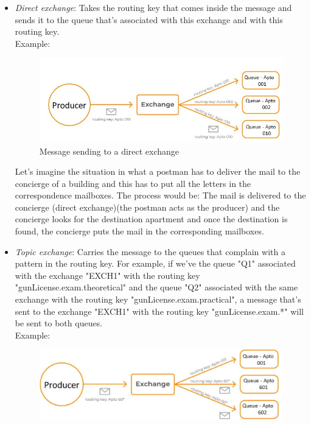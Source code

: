 \documentclass[4paper,12pt]{article}
\begin{document}
\begin{itemize}
    \item \textit{Direct exchange}: Takes the routing key that comes inside the message and sends it to the queue that's associated with this exchange and with this routing key.\\
    Example:\\
    \begin{figure}[H]
        \centering
        \includegraphics[scale = 0.7]{Images/direct_exchange.jpg}
        \caption{Message sending to a direct exchange}
        \label{fig:direct_exchange}
    \end{figure}
    Let's imagine the situation in what a postman has to deliver the mail to the concierge of a building and this has to put all the letters in the correspondence mailboxes. The process would be: The mail is delivered to the concierge (direct exchange)(the postman acts as the producer) and the concierge looks for the destination apartment and once the destination is found, the concierge puts the mail in the corresponding mailboxes.
    \item \textit{Topic exchange}: Carries the message to the queues that complain with a pattern in the routing key. For example, if we've the queue "Q1" associated with the exchange "EXCH1" with the routing key "gunLicense.exam.theoretical" and the queue "Q2" associated with the same exchange with the routing key "gunLicense.exam.practical", a message that's sent to the exchange "EXCH1" with the routing key "gunLicense.exam.*" will be sent to both queues.\\
    Example:\\
    \begin{figure}[H]
        \centering
        \includegraphics[scale = 0.4]{Images/topic_exchange.jpg}

\end{figure}
\end{itemize}
\end{document}
